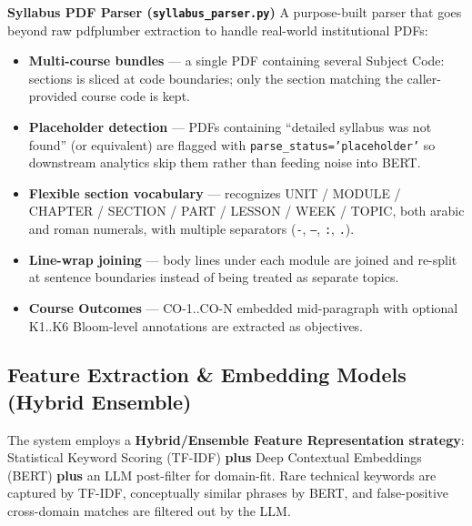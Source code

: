 \textbf{Syllabus PDF Parser (\texttt{syllabus\_parser.py})}
A purpose-built parser that goes beyond raw pdfplumber extraction to handle real-world institutional PDFs:
\begin{itemize}
    \item \textbf{Multi-course bundles} --- a single PDF containing several Subject Code: sections is sliced at code boundaries; only the section matching the caller-provided course code is kept.
    \item \textbf{Placeholder detection} --- PDFs containing ``detailed syllabus was not found'' (or equivalent) are flagged with \texttt{parse\_status='placeholder'} so downstream analytics skip them rather than feeding noise into BERT.
    \item \textbf{Flexible section vocabulary} --- recognizes UNIT / MODULE / CHAPTER / SECTION / PART / LESSON / WEEK / TOPIC, both arabic and roman numerals, with multiple separators (\texttt{-}, \texttt{--}, \texttt{:}, \texttt{.}).
    \item \textbf{Line-wrap joining} --- body lines under each module are joined and re-split at sentence boundaries instead of being treated as separate topics.
    \item \textbf{Course Outcomes} --- CO-1..CO-N embedded mid-paragraph with optional K1..K6 Bloom-level annotations are extracted as objectives.
\end{itemize}

\subsection{Feature Extraction \& Embedding Models (Hybrid Ensemble)}
The system employs a \textbf{Hybrid/Ensemble Feature Representation strategy}: Statistical Keyword Scoring (TF-IDF) \textbf{plus} Deep Contextual Embeddings (BERT) \textbf{plus} an LLM post-filter for domain-fit. Rare technical keywords are captured by TF-IDF, conceptually similar phrases by BERT, and false-positive cross-domain matches are filtered out by the LLM.

